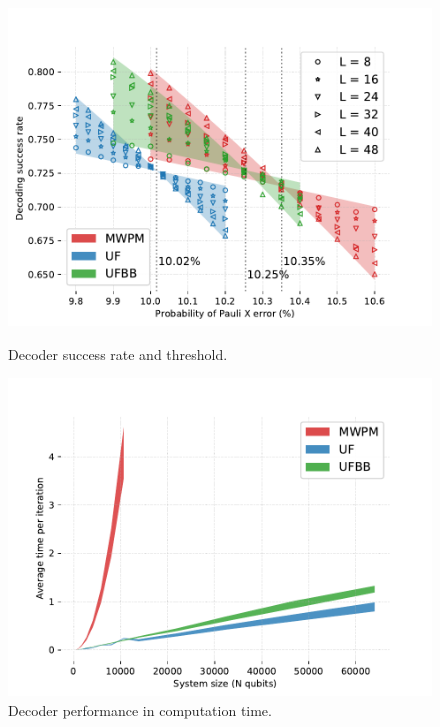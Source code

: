 \documentclass[11pt, a4paper, twoside, titlepage ,dvipsnames]{report}
\begin{document}
\begin{figure}[t]
\centering
\begin{minipage}{.5\textwidth}
  \centering
\includegraphics[width=\textwidth]{threshold.pdf}
    \caption{Decoder success rate and threshold.}\label{fig4}
\end{minipage}%
\begin{minipage}{.5\textwidth}
  \centering
    \includegraphics[width=\textwidth]{time.pdf}
    \caption{Decoder performance in computation time.}\label{fig5}
\end{minipage}
\end{figure}
\end{document}
